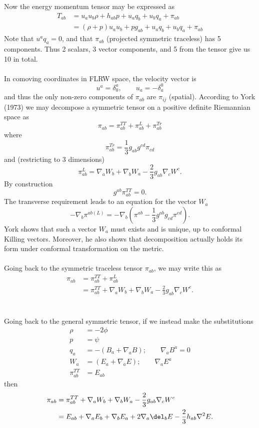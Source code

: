 \documentclass[10pt,letterpaper]{article}
\begin{document}
Now the energy momentum tensor may be expressed as 
\begin{align}
	T_{ab} &= u_a u_b \rho + h_{ab}p + u_a q_b + u_b q_a + \pi_{ab}\\
	&= (\rho + p)u_au_b + pg_{ab} + u_a q_b + u_b q_a + \pi_{ab}
\end{align} 
Note that $u^a q_a = 0$, and that $\pi_{ab}$ (projected symmetric traceless) has 5 components. Thus 2 scalars, 3 vector components, and 5 from the tensor give us 10 in total. \\ \\
In comoving coordinates in FLRW space, the velocity vector is
\[
	u^a = \delta^a_0,\qquad u_a = -\delta_a^0
\]
and thus the only non-zero components of $\pi_{ab}$ are $\pi_{ij}$ (spatial). According to York (1973) we may decompose a symmetric tensor on a positive definite Riemannian space as
\[
	\pi_{ab} = \pi_{ab}^{TT} + \pi_{ab}^L + \pi_{ab}^{Tr}
\]
where 
\[
	\pi_{ab}^{Tr} = \frac13 g_{ab}g^{cd}\pi_{cd}
\]
and (restricting to 3 dimensions)
\[
	\pi_{ab}^{L} = \nabla_a W_b + \nabla_b W_a -\frac23 g_{ab}\nabla_c W^c.
\]
By construction 
\[
	g^{ab}\pi_{ab}^{TT} = 0.
\]
The transverse requirement leads to an equation for the vector $W_a$
\[
	-\nabla_b \pi^{ab(L)} = - \nabla_b (\pi^{ab} -\frac13 g^{ab} g_{cd}\pi^{cd}).
\]
York shows that such a vector $W_a$ must exists and is unique, up to conformal Killing vectors. Moreover, he also shows that decomposition actually holds its form under conformal transformation on the metric. \\ \\
Going back to the symmetric traceless tensor $\pi_{ab}$, we may write this as
\begin{align}
	\pi_{ab} &= \pi_{ab}^{TT} + \pi_{ab}^L\\
	&=\pi_{ab}^{TT} +  \nabla_a W_b + \nabla_b W_a -\frac23 g_{ab}\nabla_c W^c.
\end{align}
\\ \\
Going back to the general symmetric tensor, if we instead make the substitutions
\begin{align}
	\rho &= -2\phi\\
	p &= \psi\\
	q_a &= -(B_a+\nabla_a B);\qquad \nabla_a B^a =0\\
	W_a &= (E_a +\nabla_a E);\qquad \nabla_a E^a \\
	\pi^{TT}_{ab} &= E_{ab}
\end{align}
then
\begin{align}
	\pi_{ab} &=\pi_{ab}^{TT} +  \nabla_a W_b + \nabla_b W_a -\frac23 g_{ab}\nabla_c W^c\\
	&= E_{ab} + \nabla_a E_b + \nabla_b E_a +2 \nabla_a\del_b E - \frac23h_{ab} \nabla^2 E.
\end{align}
\end{document}
